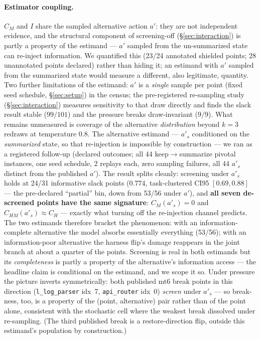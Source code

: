 \documentclass{article}
\theoremstyle{remark}
\begin{document}
\paragraph{Estimator coupling.} $C_M$ and $I$ share the sampled alternative
action $a'$: they are not independent evidence, and the structural component
of screening-off (\S\ref{sec:interaction}) is partly a property of the
estimand --- $a'$ sampled from the un-summarized state can re-inject
information. We quantified this (23/24 annotated shielded points; 28
unannotated points declared) rather than hiding
it; an estimand with $a'$ sampled from the summarized state would measure a
different, also legitimate, quantity. Two further limitations of the
estimand: $a'$ is a \emph{single} sample per point (fixed seed schedule,
\S\ref{sec:setup}) in the census; the pre-registered re-sampling study
(\S\ref{sec:interaction}) measures sensitivity to that draw directly and
finds the slack result stable ($99/101$) and the pressure breaks
draw-invariant ($9/9$). What remains unmeasured is coverage of the
alternative \emph{distribution} beyond $k=3$ redraws at temperature $0.8$.
The alternative estimand --- $a'_s$ conditioned on the \emph{summarized}
state, so that re-injection is impossible by construction --- we ran as a
registered follow-up (declared outcomes; all 44 keep$\to$summarize pivotal
instances, one seed schedule, 2 replays each, zero sampling failures, all
44 $a'_s$ distinct from the published $a'$). The result splits cleanly:
screening under $a'_s$ holds at 24/31 informative slack points (0.774,
task-clustered CI95 $[0.69, 0.88]$ --- the pre-declared ``partial'' bin,
down from 53/56 under $a'$), and \textbf{all seven de-screened points have
the same signature}: $C_M(a'_s) = 0$ and $C_{HM}(a'_s) \approx C_H$ ---
exactly what turning off the re-injection channel predicts. The two
estimands therefore bracket the phenomenon: with an
information-complete alternative the model absorbs essentially everything
(53/56); with an information-poor alternative the harness flip's damage
reappears in the joint branch at about a quarter of the points. Screening
is real in both estimands but its \emph{completeness} is partly a property
of the alternative's information access --- the headline claim
is conditional on the estimand, and we scope it so. Under pressure the
picture inverts symmetrically: both published mt6 break points in this
direction (\texttt{l\_log\_parser} idx~7, \texttt{api\_router} idx~0)
\emph{screen} under $a'_s$ --- so break-ness, too, is a property of the
(point, alternative) pair rather than of the point alone, consistent with
the stochastic cell where the weakest break dissolved under re-sampling.
(The third published break is a restore-direction flip, outside this
estimand's population by construction.)
\end{document}
